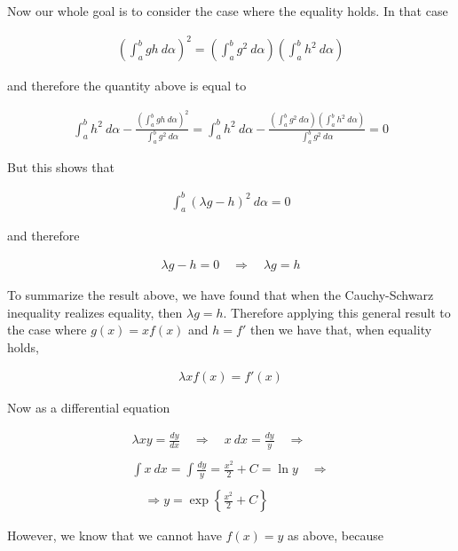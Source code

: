 \documentclass{article}
\begin{document}
  Now our whole goal is to consider the case where the equality holds.  In that case 

  \begin{align*}
    \left( \int_a^b gh \ d\alpha \right)^2 = \left( \int_a^b g^2 \ d\alpha\right)\left( \int_a^b h^2 \ d\alpha\right)
  \end{align*}

  and therefore the quantity above is equal to 

  \begin{align*}
    \int_a^b h^2 \ d\alpha - \frac{\left(\int_a^b gh \ d\alpha \right)^2}{\int_a^b g^2 \ d\alpha} = \int_a^b h^2 \ d\alpha - \frac{\left( \int_a^b g^2 \ d\alpha\right)\left( \int_a^b h^2 \ d\alpha\right)}{\int_a^b g^2 \ d\alpha} = 0
  \end{align*}

  But this shows that 

  \begin{align*}
    \int_a^b (\lambda g - h)^2 \ d\alpha =0
  \end{align*}

  and therefore 

  \begin{align*}
    \lambda g - h = 0 \quad \Rightarrow \quad \lambda g = h
  \end{align*}

  To summarize the result above, we have found that when the Cauchy-Schwarz inequality realizes equality, then $\lambda g = h$.  Therefore applying this general result to the case where $g(x)=xf(x)$ and $h=f'$ then we have that, when equality holds,

  \begin{align*}
    \lambda xf(x) = f'(x)
  \end{align*}

  Now as a differential equation 

  \begin{align*}
    \lambda xy = \frac{dy}{dx} \quad \Rightarrow \quad x\ dx = \frac{dy}{y} \quad \Rightarrow \\\\
    \int x\ dx = \int \frac{dy}{y} = \frac{x^2}{2} + C = \ln y \quad \Rightarrow \\\\
    \quad \Rightarrow y = \exp\left\{\frac{x^2}{2}+C\right\}
  \end{align*}

  However, we know that we cannot have $f(x)=y$ as above, because 
\end{document}
